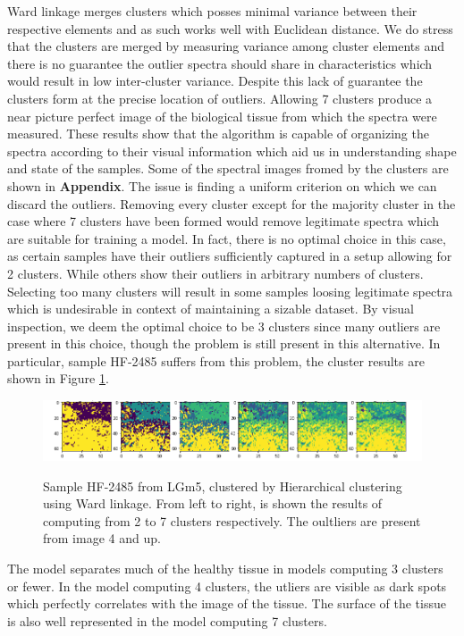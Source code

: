 Ward linkage merges clusters which posses minimal variance between their respective elements and as such works well with Euclidean distance. We do stress that the clusters are merged by measuring variance among cluster elements and there is no guarantee the outlier spectra should share in characteristics which would result in low inter-cluster variance. Despite this lack of guarantee the clusters form at the precise location of outliers. Allowing 7 clusters produce a near picture perfect image of the biological tissue from which the spectra were measured. These results show that the algorithm is capable of organizing the spectra according to their visual information which aid us in understanding shape and state of the samples. Some of the spectral images fromed by the clusters are shown in \textbf{Appendix}. The issue is finding a uniform criterion on which we can discard the outliers. Removing every cluster except for the majority cluster in the case where 7 clusters have been formed would remove legitimate spectra which are suitable for training a model. In fact, there is no optimal choice in this case, as certain samples have their outliers sufficiently captured in a setup allowing for 2 clusters. While others show their outliers in arbitrary numbers of clusters. Selecting too many clusters will result in some samples loosing legitimate spectra which is undesirable in context of maintaining a sizable dataset. By visual inspection, we deem the optimal choice to be 3 clusters since many outliers are present in this choice, though the problem is still present in this alternative. In particular, sample HF-2485 suffers from this problem, the cluster results are shown in Figure \ref{fig:hf_2485}.

\begin{figure}[h]

    \centering
{\includegraphics[width=15cm]{images/Ward_linkage/LGm-5/HF-2485_V1B_1.h5_9.png} }
\caption{Sample HF-2485 from LGm5, clustered by Hierarchical clustering using Ward linkage. From left to right, is shown the results of computing from 2 to 7 clusters respectively. The oultliers are present from image 4 and up.
\label{fig:hf_2485}}%
\end{figure}

 The model separates much of the healthy tissue in models computing 3 clusters or fewer. In the model computing 4 clusters, the utliers are visible as dark spots which perfectly correlates with the image of the tissue. The surface of the tissue is also well represented in the model computing 7 clusters.

